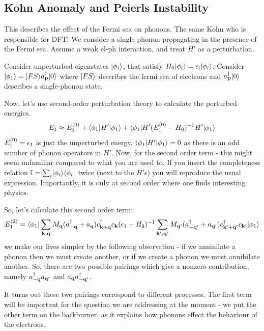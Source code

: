 \subsection{Kohn Anomaly and Peierls Instability}
This describes the effect of the Fermi sea on phonons. The same Kohn who is responsible for DFT! We consider a single phonon propagating in the presence of the Fermi sea.  Assume a weak el-ph interaction, and treat $H'$ as a perturbation.

Consider unperturbed eigenstates $\lvert \phi_i \rangle$, that satisfy $H_0\lvert \phi_i \rangle = \epsilon_i\lvert \phi_i \rangle$. Consider $\lvert \phi_1 \rangle = \lvert FS \rangle a^\dagger_{\mathbf{p}} \lvert 0 \rangle$ where $\lvert FS \rangle$ describes the fermi sea of electrons and $a^\dagger_{\mathbf{p}}\lvert 0 \rangle$ describes a single-phonon state.

Now, let's use second-order perturbation theory to calculate the perturbed energies.
\begin{equation}
    E_1 \approx E_1^{(0)} + \langle \phi_1 \rvert H'\lvert \phi_1 \rangle + \langle \phi_1 \rvert H'(E_1^{(0)} - H_0)^{-1}H'\lvert \phi_1 \rangle
\end{equation}
$E_1^{(0)} = \epsilon_1$ is just the unperturbed energy. $\langle \phi_1 \rvert H'\lvert \phi_1 \rangle = 0$ as there is an odd number of phonon operators in $H'$. Now, for the second order term - this might seem unfamiliar compared to what you are used to. If you insert the completeness relation $\mathbb{I} = \sum_i \lvert \phi_i \rangle \langle \phi_i \rvert$ twice (next to the $H'$s) you will reproduce the usual expression. Importantly, it is only at second order where one finds interesting physics.

So, let's calculate this second order term:
\begin{equation}\label{eq-secondordercorrectionelph}
    E_1^{(2)} = \langle \phi_1 \rvert\sum_{\mathbf{k}, \mathbf{q}} M_{\mathbf{q}}(a^\dagger_{-\mathbf{q}} + a_{\mathbf{q}})c^\dagger_{\mathbf{k} + \mathbf{q}}c_{\mathbf{k}}(\epsilon_1 - H_0)^{-1}\sum_{\mathbf{k}', \mathbf{q}'} M_{\mathbf{q}'}(a^\dagger_{-\mathbf{q}'} + a_{\mathbf{q}'})c^\dagger_{\mathbf{k}' + \mathbf{q}'}c_{\mathbf{k}'}\lvert \phi_1 \rangle
\end{equation}
we make our lives simpler by the following observation - if we anninilate a phonon then we must create another, or if we create a phonon we must annihilate another. So, there are two possible pairings which give a nonzero contribution, namely $a^\dagger_{-\mathbf{q}}a_{\mathbf{q}'}$ and $a_{\mathbf{q}}a^\dagger_{-\mathbf{q}'}$.

It turns out these two pairings correspond to different processes. The first term will be important for the question we are addressing at the moment - we put the other term on the backburner, as it explains how phonons effect the behaviour of the electrons.

